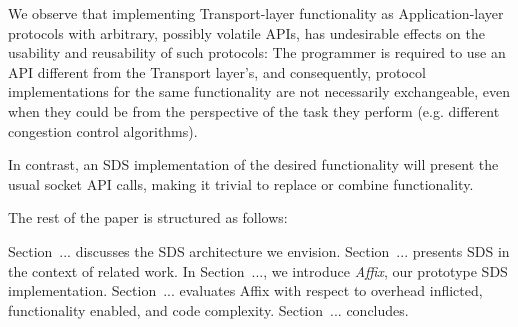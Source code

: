 We observe that implementing Transport-layer
functionality as Application-layer protocols with arbitrary, possibly
volatile \acp{API}, has undesirable effects on the usability and
reusability of such protocols: The programmer is required to use
an \ac{API} different from the Transport layer's, and consequently,
protocol implementations for the same functionality are not necessarily
exchangeable, even when they could be from the perspective of the
task they perform (e.g. different congestion control algorithms).

In contrast, an \ac{SDS} implementation of the desired functionality 
will present the usual socket \ac{API} calls, making it trivial to 
replace or combine functionality.




The rest of the paper is structured as follows:

Section~... discusses the \ac{SDS} architecture we envision.
Section~... presents \ac{SDS} in the context of related work.
In Section~..., we introduce \textit{Affix}, our prototype \ac{SDS} 
implementation.
Section~... evaluates Affix with respect to overhead inflicted, 
functionality enabled, and code complexity.
Section~... concludes.

